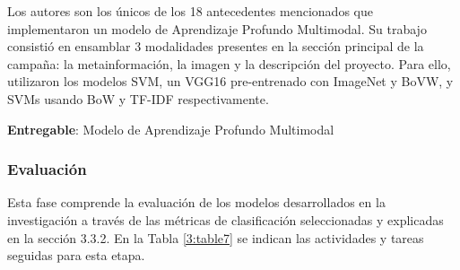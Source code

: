 Los autores \cite{pr_cheng2019deeplearning} son los únicos de los 18 antecedentes mencionados que implementaron un modelo de Aprendizaje Profundo Multimodal. Su trabajo consistió en ensamblar 3 modalidades presentes en la sección principal de la campaña: la metainformación, la imagen y la descripción del proyecto. Para ello, utilizaron los modelos SVM, un VGG16 pre-entrenado con ImageNet y BoVW, y SVMs usando BoW y TF-IDF respectivamente.

\textbf{Entregable}: Modelo de Aprendizaje Profundo Multimodal

\subsubsection{Evaluación}
Esta fase comprende la evaluación de los modelos desarrollados en la investigación a través de las métricas de clasificación seleccionadas y explicadas en la sección 3.3.2. En la Tabla \ref{3:table7} se indican las actividades y tareas seguidas para esta etapa.

